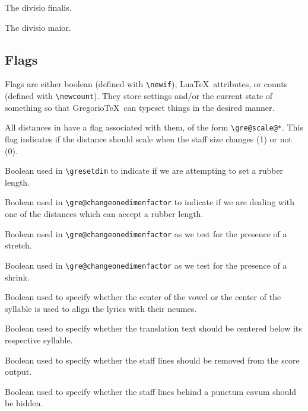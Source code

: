 The divisio finalis.

The divisio maior.


\subsection{Flags}

Flags are either boolean (defined with \verb=\newif=), Lua\TeX\ attributes, or counts (defined with \verb=\newcount=).  They store settings and/or the current state of something so that Gregorio\TeX\ can typeset things in the desired manner.

All distances in  have a flag associated with them, of the form \verb=\gre@scale@*=.  This flag
indicates if the distance should scale when the staff size changes (1)
or not (0).

Boolean used in \verb=\gresetdim= to indicate if we are attempting to set a rubber length.

Boolean used in \verb=\gre@changeonedimenfactor= to indicate if we are dealing with one of the distances which can accept a rubber length.

Boolean used in \verb=\gre@changeonedimenfactor= as we test for the presence of a stretch.

Boolean used in \verb=\gre@changeonedimenfactor= as we test for the presence of a shrink.

Boolean used to specify whether the center of the vowel or the center of the syllable is used to align the lyrics with their neumes.

Boolean used to specify whether the translation text should be centered below its respective syllable.

Boolean used to specify whether the staff lines should be removed from the score output.

Boolean used to specify whether the staff lines behind a punctum cavum should be hidden.

